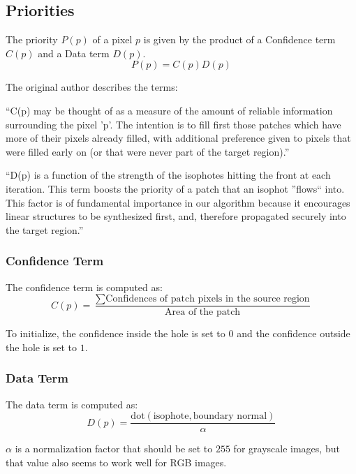 \documentclass{InsightArticle}
\begin{document}
\subsection{Priorities}
\label{subsec:AlgorithmDetails:Priorities}

The priority $P(p)$ of a pixel $p$ is given by the product of a Confidence term $C(p)$ and a Data term $D(p)$.
\begin{equation}
P(p) = C(p)D(p)
\end{equation}

The original author describes the terms:

``C(p) may be thought of as a measure of the amount of reliable information surrounding the pixel 'p'. The intention is to fill first those patches which have more of their pixels already filled, with additional preference given to pixels that were filled early on (or that were never part of the target region).''

``D(p) is a function of the strength of the isophotes hitting the front at each iteration. This term boosts the priority of a patch that an isophot ''flows`` into. This factor is of fundamental importance in our algorithm because it encourages linear structures to be synthesized first, and, therefore propagated securely into the target region.''

\subsubsection{Confidence Term}
The confidence term is computed as:
\begin{equation}
 C(p) = \frac{\sum \mbox{Confidences of patch pixels in the source region}}{\mbox{Area of the patch}}
\end{equation}

To initialize, the confidence inside the hole is set to $0$ and the confidence outside the hole is set to $1$.

\subsubsection{Data Term}
The data term is computed as:
\begin{equation}
 D(p) = \frac{\mbox{dot}(\mbox{isophote}, \mbox{boundary normal})}{\alpha}
\end{equation}

$\alpha$ is a normalization factor that should be set to $255$ for grayscale images, but that value also seems to work well for RGB images.
\end{document}
